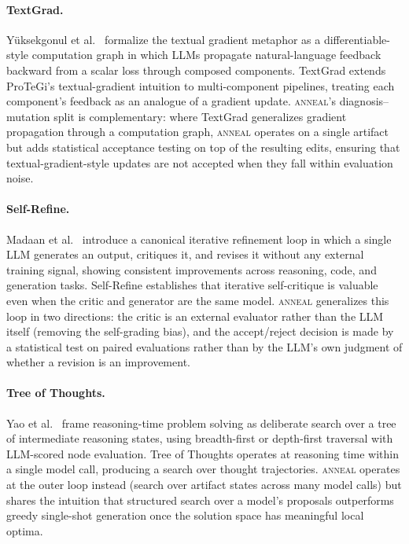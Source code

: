 \paragraph{TextGrad.}
Y\"uksekgonul et al.~\cite{yuksekgonul2024textgrad} formalize the textual gradient metaphor as a differentiable-style computation graph in which LLMs propagate natural-language feedback backward from a scalar loss through composed components.
TextGrad extends ProTeGi's textual-gradient intuition to multi-component pipelines, treating each component's feedback as an analogue of a gradient update.
\textsc{anneal}'s diagnosis--mutation split is complementary: where TextGrad generalizes gradient propagation through a computation graph, \textsc{anneal} operates on a single artifact but adds statistical acceptance testing on top of the resulting edits, ensuring that textual-gradient-style updates are not accepted when they fall within evaluation noise.

\paragraph{Self-Refine.}
Madaan et al.~\cite{madaan2023selfrefine} introduce a canonical iterative refinement loop in which a single LLM generates an output, critiques it, and revises it without any external training signal, showing consistent improvements across reasoning, code, and generation tasks.
Self-Refine establishes that iterative self-critique is valuable even when the critic and generator are the same model.
\textsc{anneal} generalizes this loop in two directions: the critic is an external evaluator rather than the LLM itself (removing the self-grading bias), and the accept/reject decision is made by a statistical test on paired evaluations rather than by the LLM's own judgment of whether a revision is an improvement.

\paragraph{Tree of Thoughts.}
Yao et al.~\cite{yao2023tot} frame reasoning-time problem solving as deliberate search over a tree of intermediate reasoning states, using breadth-first or depth-first traversal with LLM-scored node evaluation.
Tree of Thoughts operates at reasoning time within a single model call, producing a search over thought trajectories.
\textsc{anneal} operates at the outer loop instead (search over artifact states across many model calls) but shares the intuition that structured search over a model's proposals outperforms greedy single-shot generation once the solution space has meaningful local optima.

